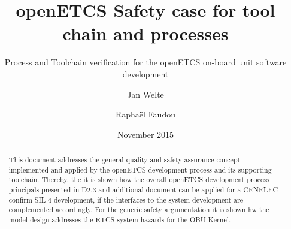 \documentclass{template/openetcs_report}
\begin{document}
\frontmatter
{}




\title{openETCS Safety case for tool chain and processes}

\subtitle{Process and Toolchain verification for the openETCS on-board unit software development}

\date{November 2015} %

\creatorname{Jan Welte]}





\author{Jan Welte}
  
\author{Raphaël Faudou}

  






\begin{abstract}
This document addresses the general quality and safety assurance concept implemented and applied by the openETCS development process and its supporting toolchain. Thereby, the it is shown how the overall openETCS development process principals presented in D2.3 and  additional document can be applied for a CENELEC confirm SIL 4 development, if the interfaces to the system development are complemented accordingly. For the generic safety argumentation it is shown hw the model design addresses the ETCS system hazards for the OBU Kernel.

\end{abstract}
\end{document}
